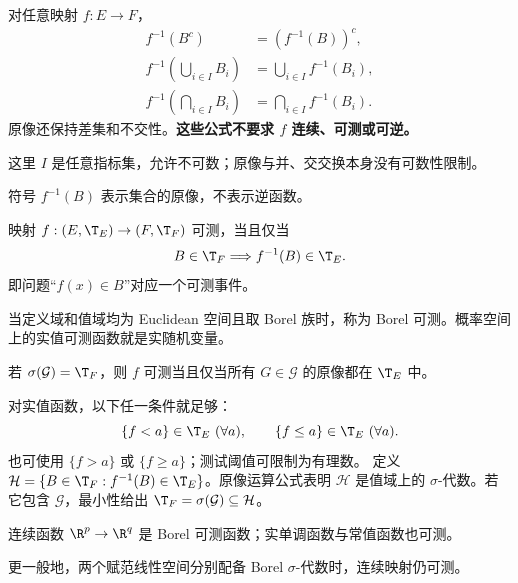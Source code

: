 对任意映射 $f:E\to F$，
\[
\begin{aligned}
f^{-1}(B^c)&=(f^{-1}(B))^c,\\
f^{-1}\!\left(\bigcup_{i\in I}B_i\right)&=\bigcup_{i\in I}f^{-1}(B_i),\\
f^{-1}\!\left(\bigcap_{i\in I}B_i\right)&=\bigcap_{i\in I}f^{-1}(B_i).
\end{aligned}
\]
原像还保持差集和不交性。\textbf{这些公式不要求 $f$ 连续、可测或可逆。}

这里 $I$ 是任意指标集，允许不可数；原像与并、交交换本身没有可数性限制。

符号 $f^{-1}(B)$ 表示集合的原像，不表示逆函数。

映射 $f:(E,\T_E)\to(F,\T_F)$ 可测，当且仅当
\[
B\in\T_F\Longrightarrow f^{-1}(B)\in\T_E.
\]
即问题“$f(x)\in B$”对应一个可测事件。

当定义域和值域均为 Euclidean 空间且取 Borel 族时，称为 Borel 可测。概率空间上的实值可测函数就是实随机变量。

若 $\sigma(\mathcal G)=\T_F$，则 $f$ 可测当且仅当所有 $G\in\mathcal G$ 的原像都在 $\T_E$ 中。

对实值函数，以下任一条件就足够：
\[
\{f<a\}\in\T_E\ (\forall a),\qquad
\{f\le a\}\in\T_E\ (\forall a).
\]
也可使用 $\{f>a\}$ 或 $\{f\ge a\}$；测试阈值可限制为有理数。
定义 $\mathcal H=\{B\in\T_F:f^{-1}(B)\in\T_E\}$。原像运算公式表明 $\mathcal H$ 是值域上的 $\sigma$-代数。若它包含 $\mathcal G$，最小性给出 $\T_F=\sigma(\mathcal G)\subseteq\mathcal H$。

连续函数 $\R^p\to\R^q$ 是 Borel 可测函数；实单调函数与常值函数也可测。

更一般地，两个赋范线性空间分别配备 Borel $\sigma$-代数时，连续映射仍可测。

